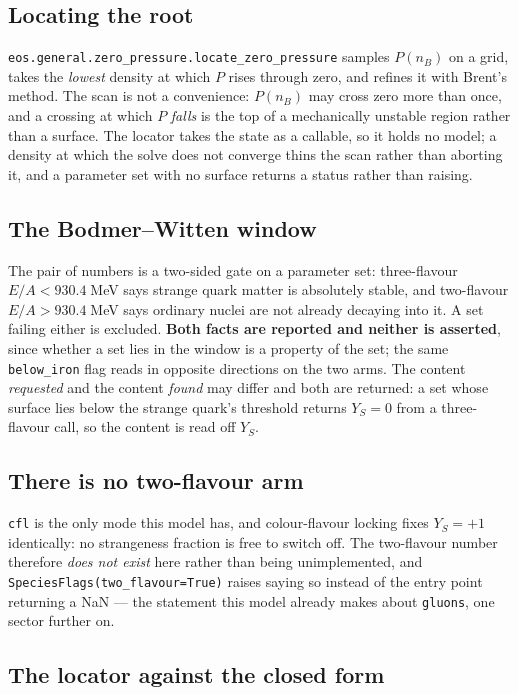 \documentclass[aps,prc,onecolumn,superscriptaddress,nofootinbib,10pt]{revtex4-2}
\begin{document}
\subsection{Locating the root}

\texttt{eos.general.zero\_pressure.locate\_zero\_pressure} samples $P(n_B)$ on
a grid, takes the \emph{lowest} density at which $P$ rises through zero, and
refines it with Brent's method. The scan is not a convenience: $P(n_B)$ may
cross zero more than once, and a crossing at which $P$ \emph{falls} is the top
of a mechanically unstable region rather than a surface. The locator takes the
state as a callable, so it holds no model; a density at which the solve does
not converge thins the scan rather than aborting it, and a parameter set with
no surface returns a status rather than raising.

\subsection{The Bodmer--Witten window}

The pair of numbers is a two-sided gate on a parameter set: three-flavour
$E/A < 930.4\;$MeV says strange quark matter is absolutely stable, and
two-flavour $E/A > 930.4\;$MeV says ordinary nuclei are not already decaying
into it. A set failing either is excluded. \textbf{Both facts are reported and
neither is asserted}, since whether a set lies in the window is a property of
the set; the same \texttt{below\_iron} flag reads in opposite directions on the
two arms. The content \emph{requested} and the content \emph{found} may differ
and both are returned: a set whose surface lies below the strange quark's
threshold returns $Y_S = 0$ from a three-flavour call, so the content is read
off $Y_S$.

\subsection{There is no two-flavour arm}

\texttt{cfl} is the only mode this model has, and colour-flavour locking fixes
$Y_S = +1$ identically: no strangeness fraction is free to switch off. The
two-flavour number therefore \emph{does not exist} here rather than being
unimplemented, and \texttt{SpeciesFlags(two\_flavour=True)} raises saying so
instead of the entry point returning a NaN --- the statement this model already
makes about \texttt{gluons}, one sector further on.

\subsection{The locator against the closed form}
\end{document}
